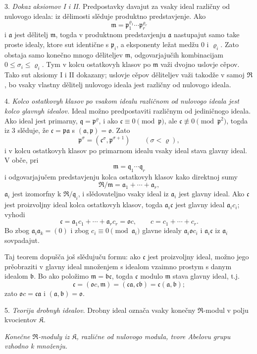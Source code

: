 \documentclass[11pt]{article}
\providecommand{\mR}{\mathfrak{R}}
\providecommand{\mK}{\mathfrak{K}}
\providecommand{\ma}{\mathfrak{a}}
\providecommand{\mb}{\mathfrak{b}}
\providecommand{\mc}{\mathfrak{c}}
\providecommand{\mm}{\mathfrak{m}}
\providecommand{\mo}{\mathfrak{o}}
\providecommand{\mq}{\mathfrak{q}}
\providecommand{\mpideal}{\mathfrak{p}}
\begin{document}
3. \emph{Dokaz aksiomov I i II.} Predpostavky davajut za vsaky ideal različny od nulovogo ideala: iz dělimosti slěduje produktno predstavjenje. Ako
\[
        \mm=\mpideal_1^{\varrho_1}\cdots\mpideal_r^{\varrho_r}
\]
i $\ma$ jest dělitelj $\mm$, togda v produktnom predstavjenju $\ma$ nastupajut samo take proste idealy, ktore sut identične s $\mpideal_i$, a eksponenty ležat medžu $0$ i $\varrho_i$. Zato obstaja samo konečno mnogo děliteljev $\mm$, odgovarjajučih kombinacijam $0\le\sigma_i\le\varrho_i$. Tym v kolcu ostatkovyh klasov po $\mm$ važi dvojno uslovje cěpov. Tako sut aksiomy I i II dokazany; uslovje cěpov děliteljev važi takodže v samoj $\mR$, bo vsaky vlastny dělitelj nulovogo ideala jest različny od nulovogo ideala.

4. \emph{Kolco ostatkovyh klasov po vsakom idealu različnom od nulovogo ideala jest kolco glavnyh idealov.} Ideal možno predpostaviti različnym od jediničnogo ideala. Ako ideal jest primarny, $\mq=\mpideal^\varrho$, i ako $\mc\equiv0\pmod{\mpideal}$, ale $\mc\not\equiv0\pmod{\mpideal^2}$, togda iz 3 slěduje, že $\mc=\mpideal\ma$ s $(\ma,\mpideal)=\mo$. Zato
\[
        \mpideal^\sigma=(\mc^\sigma,\mpideal^{\sigma+1})
        \qquad(\sigma<\varrho),
\]
i v kolcu ostatkovyh klasov po primarnom idealu vsaky ideal stava glavny ideal. V obče, pri
\[
        \mm=\mq_1\cdots\mq_r
\]
i odgovarjajučem predstavjenju kolca ostatkovyh klasov kako direktnoj sumy
\[
        \mR/\mm=\ma_1+\cdots+\ma_r,
\]
$\ma_i$ jest izomorfny k $\mR/\mq_i$, i slědovateljno vsaky ideal iz $\ma_i$ jest glavny ideal. Ako $\mc$ jest proizvoljny ideal kolca ostatkovyh klasov, togda $\ma_i\mc$ jest glavny ideal $\ma_i c_i$; vyhodi
\[
        \mc=\ma_1c_1+\cdots+\ma_r c_r=\mo c,
        \qquad c=c_1+\cdots+c_r.
\]
Bo zbog $\ma_i\ma_k=(0)$ i zbog $c_i\equiv0\pmod{\ma_i}$ glavne idealy $\ma_i\mo c_i$ i $\ma_i\mc$ iz $\ma_i$ sovpadajut.

Taj teorem dopušča još slědujuču formu: ako $\mc$ jest proizvoljny ideal, možno jego prěobraziti v glavny ideal množenjem s idealom vzaimno prostym s danym idealom $\mb$. Bo ako položimo $\mm=\mb\mc$, togda $\mc$ modulo $\mm$ stava glavny ideal, t.j.
\[
        \mc=(\mo c,\mm)=(\mc\ma,\mc\mb)=\mc(\ma,\mb);
\]
zato $\mo c=\mc\ma$ i $(\ma,\mb)=\mo$.

5. \emph{Teorija drobnyh idealov.} Drobny ideal označa vsaky konečny $\mR$-modul v polju kvocientov $\mK$.

\emph{Konečne $\mR$-moduly iz $\mK$, različne od nulovogo modula, tvore Abelovu grupu vzhodno k množenju.}
\end{document}
